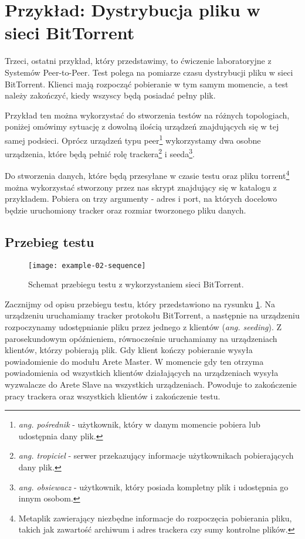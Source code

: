 \documentclass[00-praca-magisterska.tex]{subfiles}
\begin{document}
\section{Przykład: Dystrybucja pliku w sieci BitTorrent}
\label{example-torrent}

Trzeci, ostatni przykład, który przedstawimy, to ćwiczenie laboratoryjne z
Systemów Peer-to-Peer. Test polega na pomiarze czasu dystrybucji pliku w sieci
BitTorrent. Klienci mają rozpocząć pobieranie w tym samym momencie, a test należy
zakończyć, kiedy wszyscy będą posiadać pełny plik.


Przykład ten można wykorzystać do stworzenia testów na różnych topologiach,
poniżej omówimy sytuację z dowolną ilością urządzeń znajdujących się w tej samej
podsieci. Oprócz urządzeń typu peer\footnote{\emph{ang. pośrednik} - użytkownik,
który w danym momencie pobiera lub udostępnia dany plik.} wykorzystamy dwa
osobne urządzenia, które będą pełnić rolę trackera\footnote{\emph{ang.
tropiciel} - serwer przekazujący informacje użytkownikach pobierających dany
plik.} i seeda\footnote{\emph{ang. obsiewacz} - użytkownik, który posiada
kompletny plik i udostępnia go innym osobom.}.

Do stworzenia danych, które będą przesyłane w czasie testu oraz pliku
torrent\footnote{Metaplik zawierający niezbędne informacje do rozpoczęcia
pobierania pliku, takich jak zawartość archiwum i adres trackera czy sumy
kontrolne plików.} można wykorzystać stworzony przez nas skrypt
 znajdujący się w katalogu z przykładem. Pobiera on
trzy argumenty - adres i port, na których docelowo będzie uruchomiony tracker
oraz rozmiar tworzonego pliku danych.

\subsection{Przebieg testu}

\begin{figure}[htb]
\begin{center}
\leavevmode
\texttt{[image: example-02-sequence]}
\end{center}
\caption{Schemat przebiegu testu z wykorzystaniem sieci BitTorrent.}
\label{fig:example-02-sequence}
\end{figure}

Zacznijmy od opisu przebiegu testu, który przedstawiono na rysunku
\ref{fig:example-02-sequence}. Na urządzeniu  uruchamiamy tracker protokołu
BitTorrent, a następnie na urządzeniu  rozpoczynamy udostępnianie
pliku przez jednego z klientów (\emph{ang. seeding}). Z parosekundowym
opóźnieniem, równocześnie uruchamiamy na urządzeniach  klientów,
którzy pobierają plik. Gdy klient kończy pobieranie wysyła powiadomienie do
modułu Arete Master. W momencie gdy ten otrzyma powiadomienia od wszystkich
klientów działających na urządzeniach  wysyła wyzwalacze do Arete
Slave na wszystkich urządzeniach. Powoduje to zakończenie pracy trackera oraz
wszystkich klientów i zakończenie testu.
\end{document}
